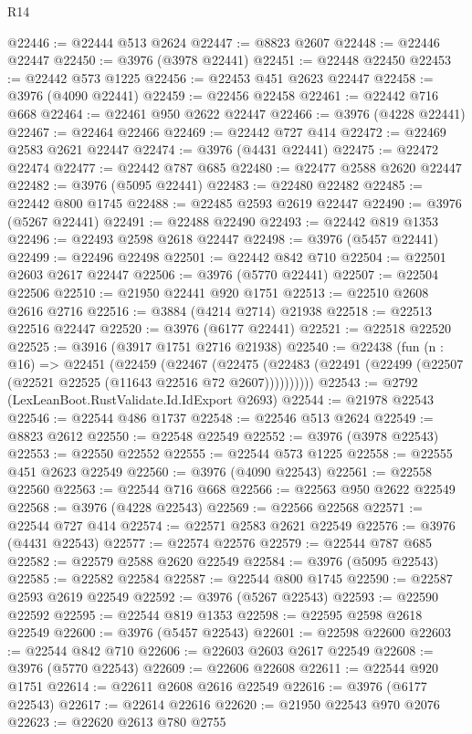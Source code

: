 \begin{lexlean}{R14}
\begin{coremodule}
@22446 := @22444 @513 @2624
@22447 := @8823 @2607
@22448 := @22446 @22447
@22450 := @3976 (@3978 @22441)
@22451 := @22448 @22450
@22453 := @22442 @573 @1225
@22456 := @22453 @451 @2623 @22447
@22458 := @3976 (@4090 @22441)
@22459 := @22456 @22458
@22461 := @22442 @716 @668
@22464 := @22461 @950 @2622 @22447
@22466 := @3976 (@4228 @22441)
@22467 := @22464 @22466
@22469 := @22442 @727 @414
@22472 := @22469 @2583 @2621 @22447
@22474 := @3976 (@4431 @22441)
@22475 := @22472 @22474
@22477 := @22442 @787 @685
@22480 := @22477 @2588 @2620 @22447
@22482 := @3976 (@5095 @22441)
@22483 := @22480 @22482
@22485 := @22442 @800 @1745
@22488 := @22485 @2593 @2619 @22447
@22490 := @3976 (@5267 @22441)
@22491 := @22488 @22490
@22493 := @22442 @819 @1353
@22496 := @22493 @2598 @2618 @22447
@22498 := @3976 (@5457 @22441)
@22499 := @22496 @22498
@22501 := @22442 @842 @710
@22504 := @22501 @2603 @2617 @22447
@22506 := @3976 (@5770 @22441)
@22507 := @22504 @22506
@22510 := @21950 @22441 @920 @1751
@22513 := @22510 @2608 @2616 @2716
@22516 := @3884 (@4214 @2714) @21938
@22518 := @22513 @22516 @22447
@22520 := @3976 (@6177 @22441)
@22521 := @22518 @22520
@22525 := @3916 (@3917 @1751 @2716 @21938)
@22540 := @22438
    (fun (n : @16) =>
    @22451
      (@22459
        (@22467
          (@22475 (@22483 (@22491 (@22499 (@22507 (@22521 @22525 (@11643 @22516 @72 @2607))))))))))
@22543 := @2792 (LexLeanBoot.RustValidate.Id.IdExport @2693)
@22544 := @21978 @22543
@22546 := @22544 @486 @1737
@22548 := @22546 @513 @2624
@22549 := @8823 @2612
@22550 := @22548 @22549
@22552 := @3976 (@3978 @22543)
@22553 := @22550 @22552
@22555 := @22544 @573 @1225
@22558 := @22555 @451 @2623 @22549
@22560 := @3976 (@4090 @22543)
@22561 := @22558 @22560
@22563 := @22544 @716 @668
@22566 := @22563 @950 @2622 @22549
@22568 := @3976 (@4228 @22543)
@22569 := @22566 @22568
@22571 := @22544 @727 @414
@22574 := @22571 @2583 @2621 @22549
@22576 := @3976 (@4431 @22543)
@22577 := @22574 @22576
@22579 := @22544 @787 @685
@22582 := @22579 @2588 @2620 @22549
@22584 := @3976 (@5095 @22543)
@22585 := @22582 @22584
@22587 := @22544 @800 @1745
@22590 := @22587 @2593 @2619 @22549
@22592 := @3976 (@5267 @22543)
@22593 := @22590 @22592
@22595 := @22544 @819 @1353
@22598 := @22595 @2598 @2618 @22549
@22600 := @3976 (@5457 @22543)
@22601 := @22598 @22600
@22603 := @22544 @842 @710
@22606 := @22603 @2603 @2617 @22549
@22608 := @3976 (@5770 @22543)
@22609 := @22606 @22608
@22611 := @22544 @920 @1751
@22614 := @22611 @2608 @2616 @22549
@22616 := @3976 (@6177 @22543)
@22617 := @22614 @22616
@22620 := @21950 @22543 @970 @2076
@22623 := @22620 @2613 @780 @2755

\end{coremodule}
\end{lexlean}
